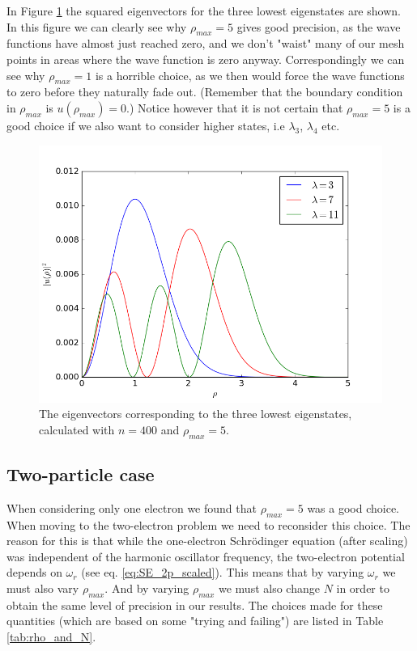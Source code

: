 \documentclass[12pt, a4paper]{article}
\begin{document}
In Figure \ref{fig:eigenvectors_1p} the squared eigenvectors for the three lowest eigenstates are shown. 
In this figure we can clearly see why $\rho_{max} = 5$ gives good precision, as the wave functions have 
almost just reached zero, and we don't "waist" many of our mesh points in areas where the wave function is 
zero anyway. Correspondingly we can see why $\rho_{max} = 1$ is a horrible choice, as we then would 
force the wave functions to zero before they naturally fade out. (Remember that the boundary condition 
in $\rho_{max}$ is $u(\rho_{max}) = 0$.) Notice however that it is not certain that $\rho_{max} = 5$ is
a good choice if we also want to consider higher states, i.e $\lambda_3$, $\lambda_4$ etc. 
\begin{figure}[ht!]
\begin{center}
\includegraphics[scale=0.7]{../Programs/Output/Eigenvectors_1pHO.png}
\caption{The eigenvectors corresponding to the three lowest eigenstates, calculated with $n=400$ and 
$\rho_{max} = 5$.}
\label{fig:eigenvectors_1p}
\end{center}
\end{figure}

\subsection{Two-particle case}

When considering only one electron we found that $\rho_{max}=5$ was a good choice. When moving to the 
two-electron problem we need to reconsider this choice. The reason for this is that while the 
one-electron Schrödinger equation (after scaling) was independent of the harmonic oscillator frequency, 
the two-electron potential depends on $\omega_r$ (see eq. \ref{eq:SE_2p_scaled}). This means that by 
varying $\omega_r$ we must also vary $\rho_{max}$. And by varying $\rho_{max}$ we must also change 
$N$ in order to obtain the same level of precision in our results. The choices made for these quantities 
(which are based on some "trying and failing") are listed in Table \ref{tab:rho_and_N}. 
\end{document}
